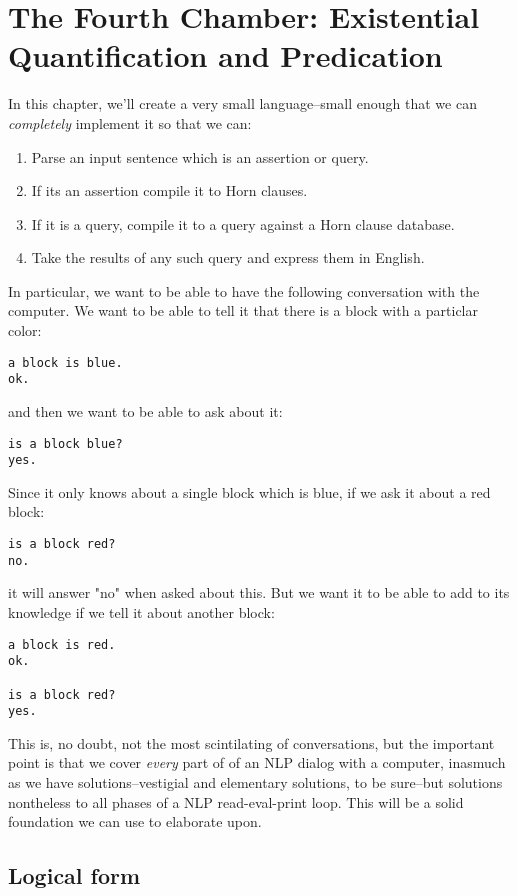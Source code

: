 \documentclass{book}[9pt]
\begin{document}
\chapter{The Fourth Chamber: Existential Quantification and Predication}
\label{language_game_0}
In this chapter, we'll  create a very small language--small enough that we can
{\em completely} implement it so that we can:
\begin{enumerate}
\item Parse an input sentence which is an assertion or query.
\item If its an assertion compile it to Horn clauses.
\item If it is a query, compile it to a query against a Horn clause database.
\item Take the results of any such query and express them in English.
\end{enumerate}
\noindent In particular, we want to be able to have the following
conversation with the computer.  We want to be able to tell it
that there is a block with a particlar color:
\begin{verbatim}
a block is blue.
ok.
\end{verbatim}
\noindent and then we want to be able to ask about it:
\begin{verbatim}
is a block blue?
yes.
\end{verbatim}
\noindent  Since it only knows about a single block which is
blue, if we ask it about a red block:
\begin{verbatim}
is a block red?
no.
\end{verbatim}
\noindent it will answer "no" when asked about this.  But
we want it to be able to add to its knowledge if we
tell it about another block:
\begin{verbatim}
a block is red.
ok.

is a block red?
yes.
\end{verbatim}
\noindent This is, no doubt, not the most scintilating of
conversations, but the important point is that we cover {\em every}
part of of an NLP dialog with a computer, inasmuch as we have
solutions--vestigial and elementary solutions, to be sure--but
solutions nontheless to all phases of a NLP read-eval-print loop.
This will be a solid foundation we can use to elaborate upon.

\section{Logical form}
\end{document}
